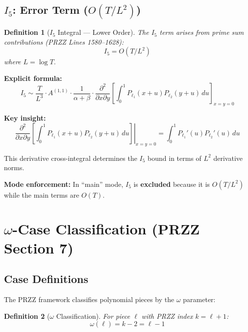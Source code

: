 \documentclass[11pt]{article}
\newtheorem{definition}{Definition}
\begin{document}
\subsection{$I_5$: Error Term ($O(T/L^2)$)}

\begin{definition}[$I_5$ Integral --- Lower Order]
The $I_5$ term arises from prime sum contributions (PRZZ Lines 1580--1628):
\begin{equation}
I_5 = O(T/L^2)
\end{equation}
where $L = \log T$.
\end{definition}

\textbf{Explicit formula:}
\begin{equation}
I_5 \sim \frac{T}{L^3} \cdot A^{(1,1)} \cdot \frac{1}{\alpha+\beta} \cdot \frac{\partial^2}{\partial x \partial y}\left[\int_0^1 P_{\ell_1}(x+u) P_{\ell_2}(y+u) \, du\right]_{x=y=0}
\end{equation}

\textbf{Key insight:}
\begin{equation}
\left.\frac{\partial^2}{\partial x \partial y}\left[\int_0^1 P_{\ell_1}(x+u) P_{\ell_2}(y+u) \, du\right]\right|_{x=y=0} = \int_0^1 P_{\ell_1}'(u) P_{\ell_2}'(u) \, du
\end{equation}

This derivative cross-integral determines the $I_5$ bound in terms of $L^2$ derivative norms.

\textbf{Mode enforcement:} In ``main'' mode, $I_5$ is \textbf{excluded} because it is $O(T/L^2)$ while the main terms are $O(T)$.

\section{$\omega$-Case Classification (PRZZ Section 7)}
\label{sec:omega}

\subsection{Case Definitions}

The PRZZ framework classifies polynomial pieces by the $\omega$ parameter:

\begin{definition}[$\omega$ Classification]
For piece $\ell$ with PRZZ index $k = \ell + 1$:
\begin{equation}
\omega(\ell) = k - 2 = \ell - 1
\end{equation}
\end{definition}
\end{document}
